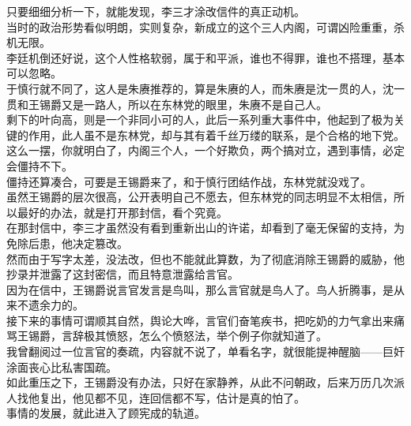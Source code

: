\begin{multicols}{\theparacolNo}
只要细细分析一下，就能发现，李三才涂改信件的真正动机。\\

当时的政治形势看似明朗，实则复杂，新成立的这个三人内阁，可谓凶险重重，杀机无限。\\

李廷机倒还好说，这个人性格软弱，属于和平派，谁也不得罪，谁也不搭理，基本可以忽略。\\

于慎行就不同了，这人是朱赓推荐的，算是朱赓的人，而朱赓是沈一贯的人，沈一贯和王锡爵又是一路人，所以在东林党的眼里，朱赓不是自己人。\\

剩下的叶向高，则是一个非同小可的人，此后一系列重大事件中，他起到了极为关键的作用，此人虽不是东林党，却与其有着千丝万缕的联系，是个合格的地下党。\\

这么一摆，你就明白了，内阁三个人，一个好欺负，两个搞对立，遇到事情，必定会僵持不下。\\

僵持还算凑合，可要是王锡爵来了，和于慎行团结作战，东林党就没戏了。\\

虽然王锡爵的层次很高，公开表明自己不愿去，但东林党的同志明显不太相信，所以最好的办法，就是打开那封信，看个究竟。\\

在那封信中，李三才虽然没有看到重新出山的许诺，却看到了毫无保留的支持，为免除后患，他决定篡改。\\

然而由于写字太差，没法改，但也不能就此算数，为了彻底消除王锡爵的威胁，他抄录并泄露了这封密信，而且特意泄露给言官。\\

因为在信中，王锡爵说言官发言是鸟叫，那么言官就是鸟人了。鸟人折腾事，是从来不遗余力的。\\

接下来的事情可谓顺其自然，舆论大哗，言官们奋笔疾书，把吃奶的力气拿出来痛骂王锡爵，言辞极其愤怒，怎么个愤怒法，举个例子你就知道了。\\

我曾翻阅过一位言官的奏疏，内容就不说了，单看名字，就很能提神醒脑——巨奸涂面丧心比私害国疏。\\

如此重压之下，王锡爵没有办法，只好在家静养，从此不问朝政，后来万历几次派人找他复出，他见都不见，连回信都不写，估计是真的怕了。\\

事情的发展，就此进入了顾宪成的轨道。\\


\end{multicols}
